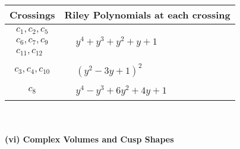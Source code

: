 \documentclass[1p]{elsarticle_modified}
\theoremstyle{definition}
\begin{document}
\begin{tabular}{m{50pt}|m{274pt}}
Crossings & \hspace{64pt}Riley Polynomials at each crossing \\
\hline $$\begin{aligned}c_{1},c_{2},c_{5}\\c_{6},c_{7},c_{9}\\c_{11},c_{12}\end{aligned}$$&$\begin{aligned}
&y^4+y^3+y^2+y+1
\end{aligned}$\\
\hline $$\begin{aligned}c_{3},c_{4},c_{10}\end{aligned}$$&$\begin{aligned}
&(y^2-3 y+1)^2
\end{aligned}$\\
\hline $$\begin{aligned}c_{8}\end{aligned}$$&$\begin{aligned}
&y^4- y^3+6 y^2+4 y+1
\end{aligned}$\\
\hline
\end{tabular}\\~\\
\newpage\flushleft \textbf{(vi) Complex Volumes and Cusp Shapes}
\end{document}
